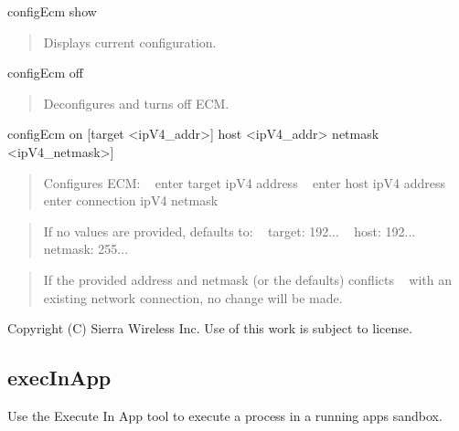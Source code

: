 \begin{DoxyVerb}configEcm show \end{DoxyVerb}


\begin{quote}
Displays current configuration. \end{quote}


\begin{DoxyVerb}configEcm off \end{DoxyVerb}


\begin{quote}
Deconfigures and turns off E\+C\+M. \end{quote}


\begin{DoxyVerb}configEcm on [target <ipV4_addr>] host <ipV4_addr> netmask <ipV4_netmask>] \end{DoxyVerb}


\begin{quote}
Configures E\+C\+M\+: ~\newline
 enter target ip\+V4 address ~\newline
 enter host ip\+V4 address ~\newline
 enter connection ip\+V4 netmask ~\newline
 \end{quote}


\begin{quote}
If no values are provided, defaults to\+: ~\newline
 target\+: 192... ~\newline
 host\+: 192... ~\newline
 netmask\+: 255... ~\newline
 \end{quote}


\begin{quote}
If the provided address and netmask (or the defaults) conflicts ~\newline
 with an existing network connection, no change will be made. \end{quote}






Copyright (C) Sierra Wireless Inc. Use of this work is subject to license. \hypertarget{toolsTarget_execInApp}{}\subsection{exec\+In\+App}\label{toolsTarget_execInApp}
Use the Execute In App tool to execute a process in a running app\textquotesingle{}s sandbox.

